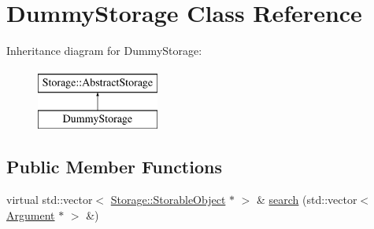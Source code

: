 \hypertarget{classDummyStorage}{
\section{DummyStorage Class Reference}
\label{d0/df2/classDummyStorage}
}
Inheritance diagram for DummyStorage:\begin{figure}[H]
\begin{center}
\leavevmode
\includegraphics[height=2.000000cm]{d0/df2/classDummyStorage}
\end{center}
\end{figure}
\subsection*{Public Member Functions}
\begin{DoxyCompactItemize}
\item 
virtual std::vector$<$ \hyperlink{classStorage_1_1StorableObject}{Storage::StorableObject} $\ast$ $>$ \& \hyperlink{classDummyStorage_abef91708b67fec5a4b35e073a19c8b2a}{search} (std::vector$<$ \hyperlink{structStorage_1_1AbstractStorage_1_1Argument}{Argument} $\ast$ $>$ \&)
\end{DoxyCompactItemize}
